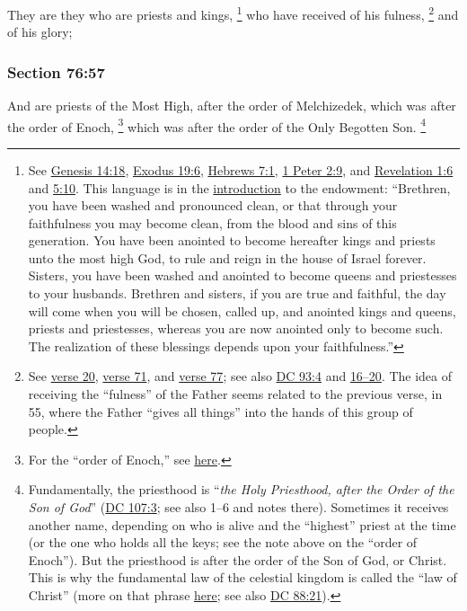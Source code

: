 		They are they who are priests and kings,%
			\footnote{%
				See \hyperref[GENESIS-14-18]{Genesis 14:18}, \hyperref[EXODUS-19-6]{Exodus 19:6}, \hyperref[HEBREWS-7-1]{Hebrews 7:1}, \hyperref[1PETER-2-9]{1 Peter 2:9}, and \hyperref[REVELATIONNT-1-6]{Revelation 1:6} and \hyperref[REVELATIONNT-5-10]{5:10}. This language is in the \hyperref[TEMPLE-ENDOWMENT-ENDOW-PRE-1990-INTRO]{introduction} to the endowment: ``Brethren, you have been washed and pronounced clean, or that through your faithfulness you may become clean, from the blood and sins of this generation. You have been anointed to become hereafter kings and priests unto the most high God, to rule and reign in the house of Israel forever. Sisters, you have been washed and anointed to become queens and priestesses to your husbands. Brethren and sisters, if you are true and faithful, the day will come when you will be chosen, called up, and anointed kings and queens, priests and priestesses, whereas you are now anointed only to become such. The realization of these blessings depends upon your faithfulness.''
				}
		who have received of his fulness,%
			\footnote{%
				See \hyperref[DC76-20]{verse 20}, \hyperref[DC76-71]{verse 71}, and \hyperref[DC76-77]{verse 77}; see also \hyperref[DC93-4]{DC 93:4} and \hyperref[DC93-16]{16--20}. The idea of receiving the ``fulness'' of the Father seems related to the previous verse, in 55, where the Father ``gives all things'' into the hands of this group of people.
				}
		and of his glory;


	\subsubsection{Section 76:57} %
		\label{DC76-57}

		And are priests of the Most High, after the order of Melchizedek, which was after the order of Enoch,%
			\footnote{%
				For the ``order of Enoch,'' see \hyperref[PRIESTHOOD-enoch]{here}.
				}
		which was after the order of the Only Begotten Son.%
			\footnote{%
				Fundamentally, the priesthood is ``\textit{the Holy Priesthood, after the Order of the Son of God}'' (\hyperref[DC107-3]{DC 107:3}; see also 1--6 and notes there). Sometimes it receives another name, depending on who is alive and the ``highest'' priest at the time (or the one who holds all the keys; see the note above on the ``order of Enoch''). But the priesthood is after the order of the Son of God, or Christ. This is why the fundamental law of the celestial kingdom is called the ``law of Christ'' (more on that phrase \hyperref[LAW-PHRASES]{here}; see also \hyperref[DC88-21]{DC 88:21}).
				}

